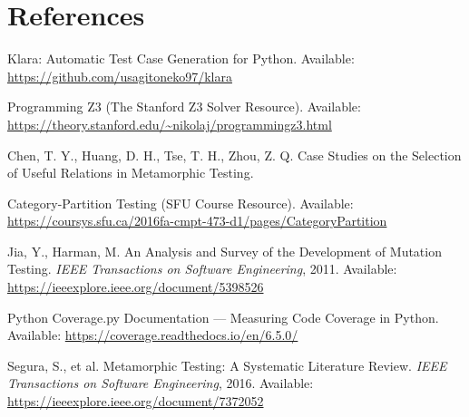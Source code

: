 \documentclass[conference]{IEEEtran}
\begin{document}
\section{References}
\begin{thebibliography}{00}

 Klara: Automatic Test Case Generation for Python. Available: \url{https://github.com/usagitoneko97/klara}

 Programming Z3 (The Stanford Z3 Solver Resource). Available: \url{https://theory.stanford.edu/~nikolaj/programmingz3.html}

 Chen, T. Y., Huang, D. H., Tse, T. H., Zhou, Z. Q. Case Studies on the Selection of Useful Relations in Metamorphic Testing.

 Category-Partition Testing (SFU Course Resource). Available: \url{https://coursys.sfu.ca/2016fa-cmpt-473-d1/pages/CategoryPartition}

 Jia, Y., Harman, M. An Analysis and Survey of the Development of Mutation Testing. \textit{IEEE Transactions on Software Engineering}, 2011. Available: \url{https://ieeexplore.ieee.org/document/5398526}

 Python Coverage.py Documentation --- Measuring Code Coverage in Python. Available: \url{https://coverage.readthedocs.io/en/6.5.0/}

 Segura, S., et al. Metamorphic Testing: A Systematic Literature Review. \textit{IEEE Transactions on Software Engineering}, 2016. Available: \url{https://ieeexplore.ieee.org/document/7372052}

\end{thebibliography}
\end{document}
